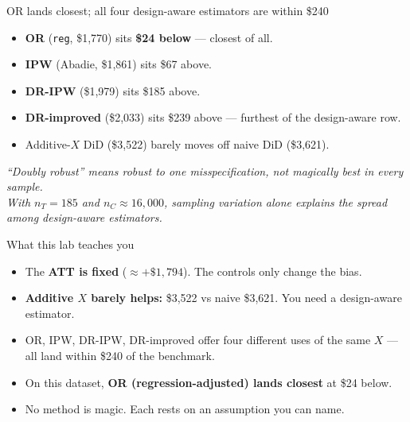 \documentclass[11pt,aspectratio=169]{beamer}
\begin{document}
\begin{frame}{OR lands closest; all four design-aware estimators are within \$240}
\vspace{0.5em}
\begin{itemize}
  \item \textbf{OR} (\texttt{reg}, \$1{,}770) sits \textbf{\$24 below} --- closest of all.
  \item \textbf{IPW} (Abadie, \$1{,}861) sits \$67 above.
  \item \textbf{DR-IPW} (\$1{,}979) sits \$185 above.
  \item \textbf{DR-improved} (\$2{,}033) sits \$239 above --- furthest of the design-aware row.
  \item Additive-$X$ DiD (\$3{,}522) barely moves off naive DiD (\$3{,}621).
\end{itemize}
\vspace{0.4em}
\begin{center}
\small\color{warmgray}\itshape
``Doubly robust'' means \textit{robust to one misspecification,} not magically best in every sample. \\
With $n_T = 185$ and $n_C \approx 16{,}000$, sampling variation alone explains the spread among design-aware estimators.
\end{center}
\end{frame}

\begin{frame}{What this lab teaches you}
\vspace{0.8em}
\begin{itemize}
  \item The \textbf{ATT is fixed} ($\approx +\$1{,}794$). \;The controls only change the bias.
  \item \textbf{Additive $X$ barely helps:} \$3{,}522 vs naive \$3{,}621. \;You need a design-aware estimator.
  \item OR, IPW, DR-IPW, DR-improved offer four different uses of the same $X$ --- all land within \$240 of the benchmark.
  \item On this dataset, \textbf{OR (regression-adjusted) lands closest} at \$24 below.
  \item No method is magic. Each rests on an assumption you can name.
\end{itemize}
\end{frame}
\end{document}
